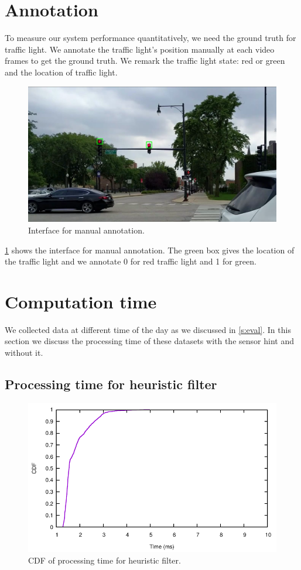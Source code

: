 \section{Annotation}
To measure our system performance quantitatively, we need the ground truth for traffic light.
We annotate the traffic light's position manually at each video frames to get the ground truth.
We remark the traffic light state: red or green and the location of traffic light.

\begin{figure}[h!]
\centering
\includegraphics[width=5.2in]{images/annotation.png}
\caption{Interface for manual annotation.}
\label{f:annotate}
\end{figure}

\ref{f:annotate} shows the interface for manual annotation.
The green box gives the location of the traffic light and we annotate 0 for red traffic light and 1 for green.

\section{Computation time}
We collected data at different time of the day as we discussed in \ref{s:eval}.
In this section we discuss the processing time of these datasets with the sensor hint and without it.

\subsection{Processing time for heuristic filter}
\begin{figure}[h!]
\centering
\includegraphics[width=5.2in]{plots/sunny_cdf_filter.pdf}
\caption{CDF of processing time for heuristic filter.}
\label{f:cdf_fil}
\end{figure}


